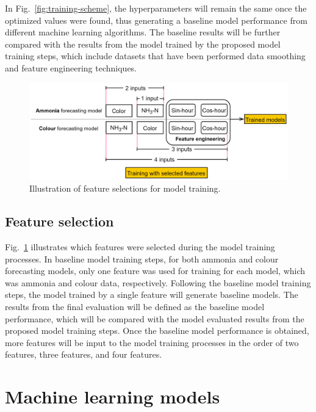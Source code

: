 In Fig.~\ref{fig:training-scheme}, the hyperparameters will remain the same once the optimized values were found, thus generating a baseline model performance from different machine learning algorithms. The baseline results will be further compared with the results from the model trained by the proposed model training steps, which include datasets that have been performed data smoothing and feature engineering techniques.

\begin{figure}[!ht]
    \centering
    \includegraphics[width=1.0\columnwidth]{imgs/pre-processing/feature-selection.png}
    \caption{Illustration of feature selections for model training.}
    \label{fig:feature-selection}
 \end{figure}

\subsection{Feature selection}
Fig.~\ref{fig:feature-selection} illustrates which features were selected during the model training processes. In baseline model training steps, for both ammonia and colour forecasting models, only one feature was used for training for each model, which was ammonia and colour data, respectively. Following the baseline model training steps, the model trained by a single feature will generate baseline models. The results from the final evaluation will be defined as the baseline model performance, which will be compared with the model evaluated results from the proposed model training steps. Once the baseline model performance is obtained, more features will be input to the model training processes in the order of two features, three features, and four features.

\section{Machine learning models}

